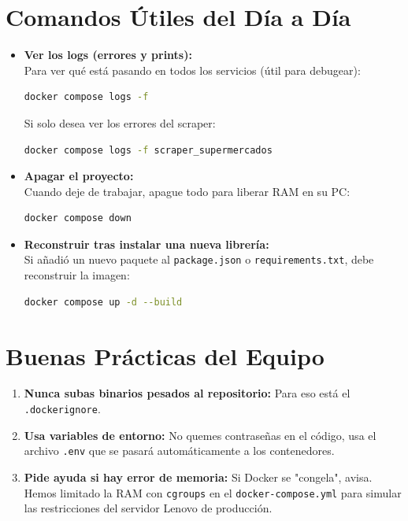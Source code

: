 \documentclass[11pt,a4paper]{article}
\begin{document}
\section{Comandos Útiles del Día a Día}

\begin{itemize}
    \item \textbf{Ver los logs (errores y prints):} \\
    Para ver qué está pasando en todos los servicios (útil para debugear):
\begin{lstlisting}[language=bash]
docker compose logs -f
\end{lstlisting}
    Si solo desea ver los errores del scraper:
\begin{lstlisting}[language=bash]
docker compose logs -f scraper_supermercados
\end{lstlisting}

    \item \textbf{Apagar el proyecto:} \\
    Cuando deje de trabajar, apague todo para liberar RAM en su PC:
\begin{lstlisting}[language=bash]
docker compose down
\end{lstlisting}

    \item \textbf{Reconstruir tras instalar una nueva librería:} \\
    Si añadió un nuevo paquete al \texttt{package.json} o \texttt{requirements.txt}, debe reconstruir la imagen:
\begin{lstlisting}[language=bash]
docker compose up -d --build
\end{lstlisting}
\end{itemize}

\section{Buenas Prácticas del Equipo}

\begin{enumerate}
    \item \textbf{Nunca subas binarios pesados al repositorio:} Para eso está el \texttt{.dockerignore}.
    \item \textbf{Usa variables de entorno:} No quemes contraseñas en el código, usa el archivo \texttt{.env} que se pasará automáticamente a los contenedores.
    \item \textbf{Pide ayuda si hay error de memoria:} Si Docker se "congela", avisa. Hemos limitado la RAM con \texttt{cgroups} en el \texttt{docker-compose.yml} para simular las restricciones del servidor Lenovo de producción.
\end{enumerate}
\end{document}
